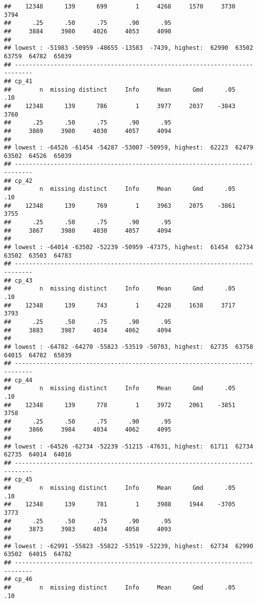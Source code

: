 \documentclass[]{article}
\begin{document}
\begin{verbatim}
##    12348      139      699        1     4268     1570     3730     3794 
##      .25      .50      .75      .90      .95 
##     3884     3980     4026     4053     4090 
## 
## lowest : -51983 -50959 -48655 -13583  -7439, highest:  62990  63502  63759  64782  65039
## ---------------------------------------------------------------------------
## cp_41 
##        n  missing distinct     Info     Mean      Gmd      .05      .10 
##    12348      139      786        1     3977     2037    -3843     3760 
##      .25      .50      .75      .90      .95 
##     3869     3980     4030     4057     4094 
## 
## lowest : -64526 -61454 -54287 -53007 -50959, highest:  62223  62479  63502  64526  65039
## ---------------------------------------------------------------------------
## cp_42 
##        n  missing distinct     Info     Mean      Gmd      .05      .10 
##    12348      139      769        1     3963     2075    -3861     3755 
##      .25      .50      .75      .90      .95 
##     3867     3980     4030     4057     4094 
## 
## lowest : -64014 -63502 -52239 -50959 -47375, highest:  61454  62734  63502  63503  64783
## ---------------------------------------------------------------------------
## cp_43 
##        n  missing distinct     Info     Mean      Gmd      .05      .10 
##    12348      139      743        1     4228     1638     3717     3793 
##      .25      .50      .75      .90      .95 
##     3883     3987     4034     4062     4094 
## 
## lowest : -64782 -64270 -55823 -53519 -50703, highest:  62735  63758  64015  64782  65039
## ---------------------------------------------------------------------------
## cp_44 
##        n  missing distinct     Info     Mean      Gmd      .05      .10 
##    12348      139      778        1     3972     2061    -3851     3758 
##      .25      .50      .75      .90      .95 
##     3866     3984     4034     4062     4095 
## 
## lowest : -64526 -62734 -52239 -51215 -47631, highest:  61711  62734  62735  64014  64016
## ---------------------------------------------------------------------------
## cp_45 
##        n  missing distinct     Info     Mean      Gmd      .05      .10 
##    12348      139      781        1     3988     1944    -3705     3773 
##      .25      .50      .75      .90      .95 
##     3873     3983     4034     4058     4093 
## 
## lowest : -62991 -55823 -55822 -53519 -52239, highest:  62734  62990  63502  64015  64782
## ---------------------------------------------------------------------------
## cp_46 
##        n  missing distinct     Info     Mean      Gmd      .05      .10 

\end{verbatim}
\end{document}
